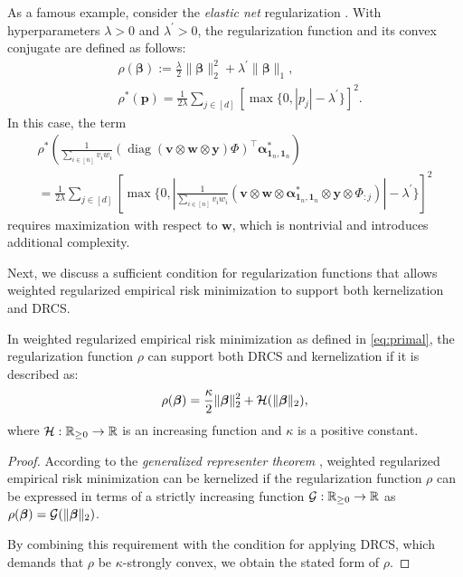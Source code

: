 As a famous example, consider the \emph{elastic net} regularization \cite{zou05regularization}. With hyperparameters $\lambda > 0$ and $\lambda^\prime > 0$, the regularization function and its convex conjugate are defined as follows:
\begin{align*}
& \rho(\bm\beta) := \frac{\lambda}{2}\|\bm\beta\|_2^2 + \lambda^\prime\|\bm\beta\|_1, \\
& \rho^*(\bm p) = \frac{1}{2\lambda}\sum_{j\in \left[d\right]}\left[\max\{0, |p_j| - \lambda^\prime \}\right]^2.
\end{align*}
In this case, the term
\begin{gather*}
	\rho^*\left(\frac{1}{\sum_{i\in[n]} v_i w_i}(\operatorname{diag}(\bm v\otimes\bm w \otimes \bm y) \Phi)^\top \bm\alpha_{\bm 1_n, \bm 1_n}^{*} \right) \\
	= \frac{1}{2\lambda} \sum_{j\in \left[d\right]} \left[\max\{0, \left|\frac{1}{\sum_{i\in[n]} v_i w_i}(\bm v \otimes \bm w \otimes \bm \alpha_{\bm 1_n, \bm 1_n}^{*} \otimes \bm y \otimes \Phi_{:j})\right| - \lambda^\prime \}\right]^2
\end{gather*}
requires maximization with respect to $\bm w$, which is nontrivial and introduces additional complexity.

Next, we discuss a sufficient condition for regularization functions that allows weighted regularized empirical risk minimization to support both kernelization and DRCS.


\begin{lemma}
In weighted regularized empirical risk minimization as defined in \ref{eq:primal}, the regularization function $\rho$ can support both DRCS and kernelization if it is described as:
\[
\rho(\bm\beta) = \frac{\kappa}{2}\|\bm\beta\|_2^2 + {\cal H}(\|\bm\beta\|_2),
\]
where ${\cal H}: \mathbb{R}_{\geq 0} \to \mathbb{R}$ is an increasing function and $\kappa$ is a positive constant.
\end{lemma}

\begin{proof}
According to the \emph{generalized representer theorem} \cite{scholkopf2001generalized}, weighted regularized empirical risk minimization can be kernelized if the regularization function $\rho$ can be expressed in terms of a strictly increasing function ${\cal G}: \mathbb{R}_{\geq 0} \to \mathbb{R}$ as $\rho(\bm\beta) = {\cal G}(\|\bm\beta\|_2)$.

By combining this requirement with the condition for applying DRCS, which demands that $\rho$ be $\kappa$-strongly convex, we obtain the stated form of $\rho$.
\end{proof}


